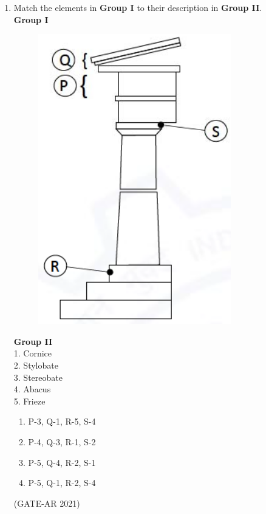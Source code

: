 \documentclass[a4paper,10pt]{article}
\begin{document}
\begin{enumerate}
    \item Match the elements in \textbf{Group I} to their description in \textbf{Group II}. \\
    \textbf{Group I}
    \begin{figure}[h!]
    \centering
    \includegraphics[width=0.25\columnwidth]{figs/09.jpg}
    \caption{}
    \label{fig:Img09}
    \end{figure}
    \newpage
    \textbf{Group II} \\
    1. Cornice \\
    2. Stylobate \\
    3. Stereobate \\
    4. Abacus \\
    5. Frieze \\
    \begin{multicols}{2}
    \begin{enumerate}
        \item P-3, Q-1, R-5, S-4
        \item P-4, Q-3, R-1, S-2
        \item P-5, Q-4, R-2, S-1
        \item P-5, Q-1, R-2, S-4
    \end{enumerate}
    \end{multicols}
    \hfill (GATE-AR 2021)


\end{enumerate}
\end{document}
